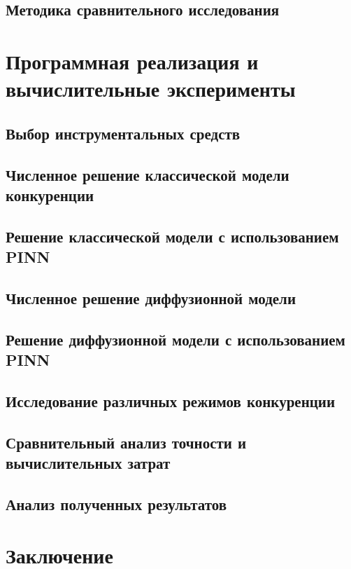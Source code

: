 
\section{Методика сравнительного исследования}
\label{sec:methodology}



\chapter{Программная реализация и вычислительные эксперименты}
\label{ch:experiments}

\section{Выбор инструментальных средств}
\label{sec:tools}


\section{Численное решение классической модели конкуренции}
\label{sec:exp-ode-numeric}

\section{Решение классической модели с использованием PINN}
\label{sec:exp-ode-pinn}

\section{Численное решение диффузионной модели}
\label{sec:exp-pde-numeric}

\section{Решение диффузионной модели с использованием PINN}
\label{sec:exp-pde-pinn}

\section{Исследование различных режимов конкуренции}
\label{sec:exp-regimes}

\section{Сравнительный анализ точности и вычислительных затрат}
\label{sec:exp-comparison}

\section{Анализ полученных результатов}
\label{sec:exp-analysis}


\chapter*{Заключение}


\printbibliography[title={Список литературы}]


